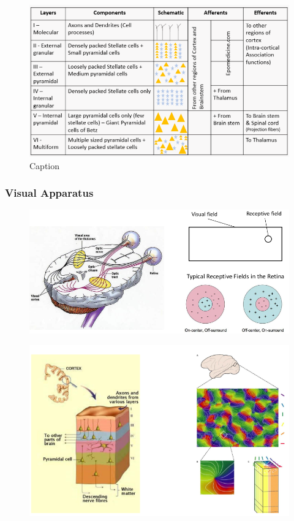 \documentclass[main]{subfiles}
\begin{document}
\begin{figure}[H]
    \centering
    \includegraphics[width=0.95\linewidth]{01_Introduction/figures/layers_table.png}
    \caption{Caption}
    \label{fig:basalandcerebellum}
\end{figure}

\subsubsection{Visual Apparatus}

\begin{figure}[H]
    \centering
    \includegraphics[width=0.8\linewidth]{01_Introduction/figures/visual_apparatus.png}
    \caption{}
    \label{fig:basalandcerebellum}
\end{figure}

\begin{figure}[H]
    \centering
    \includegraphics[width=0.8\linewidth]{01_Introduction/figures/layers_orientation.png}
    \caption{}
    \label{fig:basalandcerebellum}
\end{figure}
\end{document}
